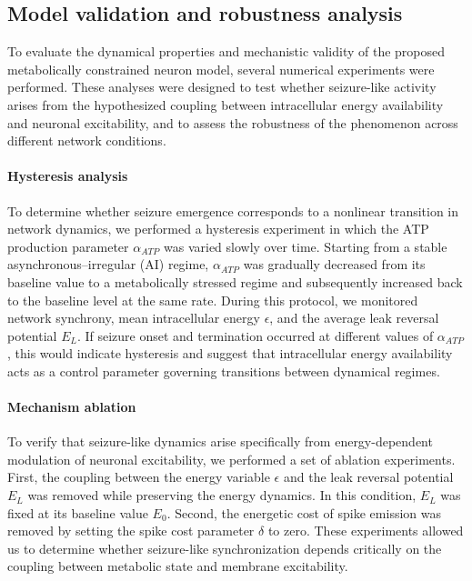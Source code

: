 \subsection*{Model validation and robustness analysis}

To evaluate the dynamical properties and mechanistic validity of the proposed metabolically constrained neuron model, several numerical experiments were performed. These analyses were designed to test whether seizure-like activity arises from the hypothesized coupling between intracellular energy availability and neuronal excitability, and to assess the robustness of the phenomenon across different network conditions.

\paragraph{Hysteresis analysis}
To determine whether seizure emergence corresponds to a nonlinear transition in network dynamics, we performed a hysteresis experiment in which the ATP production parameter $\alpha_{ATP}$ was varied slowly over time. Starting from a stable asynchronous–irregular (AI) regime, $\alpha_{ATP}$ was gradually decreased from its baseline value to a metabolically stressed regime and subsequently increased back to the baseline level at the same rate. During this protocol, we monitored network synchrony, mean intracellular energy $\epsilon$, and the average leak reversal potential $E_L$. If seizure onset and termination occurred at different values of $\alpha_{ATP}$, this would indicate hysteresis and suggest that intracellular energy availability acts as a control parameter governing transitions between dynamical regimes.

\paragraph{Mechanism ablation}
To verify that seizure-like dynamics arise specifically from energy-dependent modulation of neuronal excitability, we performed a set of ablation experiments. First, the coupling between the energy variable $\epsilon$ and the leak reversal potential $E_L$ was removed while preserving the energy dynamics. In this condition, $E_L$ was fixed at its baseline value $E_0$. Second, the energetic cost of spike emission was removed by setting the spike cost parameter $\delta$ to zero. These experiments allowed us to determine whether seizure-like synchronization depends critically on the coupling between metabolic state and membrane excitability.

